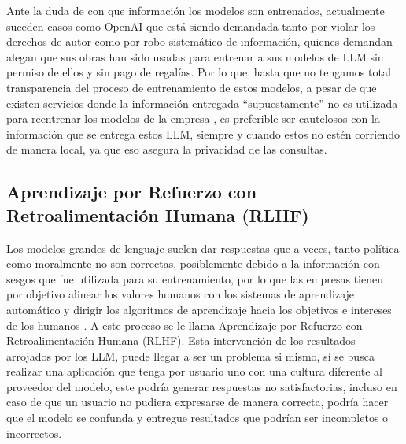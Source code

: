 Ante la duda de con que información los modelos son entrenados, actualmente suceden casos como OpenAI que está siendo demandada tanto por violar los derechos de autor \cite{privacidad3} como por robo sistemático \cite{privacidad2} de información, quienes 
demandan alegan que sus obras han sido usadas para entrenar a sus modelos de LLM sin permiso de ellos y sin pago de regalías. Por lo que, hasta que no tengamos total transparencia del proceso de entrenamiento de estos modelos, 
a pesar de que existen servicios donde la información entregada ``supuestamente'' no es utilizada para reentrenar los modelos de la empresa \cite{openai4}, es preferible ser cautelosos con la 
información que se entrega estos LLM, siempre y cuando estos no estén corriendo de manera local, ya que eso asegura la privacidad de las consultas.



\subsection{Aprendizaje por Refuerzo con Retroalimentación Humana (RLHF)}


Los modelos grandes de lenguaje suelen dar respuestas que a veces, tanto política como moralmente no son correctas, posiblemente debido a la información con sesgos que fue utilizada para su entrenamiento, por lo que 
las empresas tienen por objetivo alinear los valores humanos con los sistemas de aprendizaje automático y dirigir los algoritmos 
de aprendizaje hacia los objetivos e intereses de los humanos \cite{RLHF}. A este proceso se le llama Aprendizaje por Refuerzo con 
Retroalimentación Humana (RLHF). 
Esta intervención de los resultados arrojados por los LLM, puede llegar a ser un problema si mismo, sí se busca realizar una aplicación que tenga por usuario uno con una cultura diferente al proveedor del modelo, este podría generar respuestas no satisfactorias, incluso en caso de que un usuario no pudiera expresarse de manera correcta, podría hacer que el modelo se confunda y entregue resultados que podrían ser incompletos o incorrectos.
